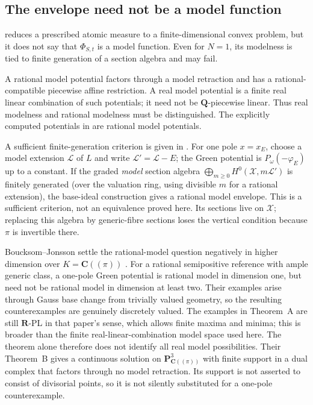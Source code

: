 \subsection{The envelope need not be a model function}
\label{sec:ch31-not-model}

 reduces a prescribed atomic measure to a
finite-dimensional convex problem, but it does not say that $\Phi_{S,t}$
is a model function.  Even for $N=1$, its modelness is tied to finite
generation of a section algebra and may fail.

\begin{remark}
\label{rem:ch31-modelness}
A rational model potential factors through a model retraction and has
a rational-compatible piecewise affine restriction.  A real model
potential is a finite real linear combination of such potentials; it need
not be $\mathbf Q$-piecewise linear.  Thus real modelness and rational
modelness must be distinguished.  The explicitly computed potentials in
 are rational model potentials.

A sufficient finite-generation criterion is given in
\cite[Remark~8.8]{BFJ15}.  For one pole $x=x_E$, choose a model extension
$\mathcal L$ of $L$ and write $\mathcal L'=\mathcal L-E$; the Green
potential is $P_\omega(-\varphi_E)$ up to a constant.  If the graded
\emph{model} section algebra
$\bigoplus_{m\geq0}H^0(\mathcal X,m\mathcal L')$ is finitely generated
(over the valuation ring, using divisible $m$ for a rational extension),
the base-ideal construction gives a rational model envelope.
This is a sufficient criterion, not an equivalence proved here.  Its
sections live on $\mathcal X$; replacing this algebra by generic-fibre
sections loses the vertical condition because $\pi$ is invertible there.

Boucksom--Jonsson settle the rational-model question negatively in
higher dimension over $K=\mathbf C((\pi))$
\cite[Theorem~A]{BJGreen24}.  For a rational semipositive reference with
ample generic class, a one-pole Green potential is rational model in
dimension one, but need not be rational model in dimension at least two.
Their examples arise through Gauss base change from trivially valued
geometry, so the resulting counterexamples are genuinely discretely valued.
The examples in Theorem~A are still $\mathbf R$-PL in that paper's sense,
which allows finite maxima and minima; this is broader than the finite
real-linear-combination model space used here.  The theorem alone therefore
does not identify all real model possibilities.  Their Theorem~B gives a
continuous solution on $\mathbf P^3_{\mathbf C((\pi))}$ with finite
support in a dual complex that factors through no model retraction.
Its support is not asserted to consist of divisorial points, so it is not
silently substituted for a one-pole counterexample.
\end{remark}

